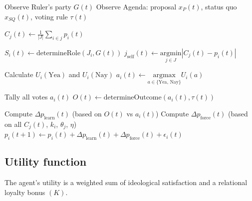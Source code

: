 \documentclass{article}
\begin{document}
	\begin{algorithm}[H]
		\caption{Policy drift game loop}
		\label{alg:game_loop}
		\begin{algorithmic}[1]
			
			\STATE {}
			\STATE Observe Ruler's party $G(t)$
			\STATE Observe Agenda: proposal $x_P(t)$, status quo $x_{SQ}(t)$, voting rule $\tau(t)$ 
			
			\STATE {}
			\STATE $C_j(t) \gets \frac{1}{|J|} \sum_{i \in j} p_i(t)$ 
			\ENDFOR
			
			\STATE $S_i(t) \gets \text{determineRole}(J_i, G(t))$ 
			\STATE $j_{\text{self}}(t) \gets \underset{j \in J}{\text{argmin}} |C_j(t) - p_i(t)|$ 
			\ENDFOR
			
			\STATE {}
			\STATE Calculate $U_i(\text{Yea})$ and $U_i(\text{Nay})$ 
			\STATE $a_i(t) \gets \underset{a \in \{\text{Yea, Nay}\}}{\text{argmax}} U_i(a)$ 
			\ENDFOR
			
			\STATE {}
			\STATE Tally all votes $a_i(t)$
			\STATE $O(t) \gets \text{determineOutcome}(a_i(t), \tau(t))$ 
			
			\STATE {}
			\STATE Compute $\Delta p_{\text{learn}}(t)$ (based on $O(t)$ vs $a_i(t)$)
			\STATE Compute $\Delta p_{\text{force}}(t)$ (based on all $C_j(t)$, $k_i$, $\theta_j$, $\eta$)
			\STATE $p_i(t+1) \gets p_i(t) + \Delta p_{\text{learn}}(t) + \Delta p_{\text{force}}(t) + \epsilon_{i}(t)$ 
			\ENDFOR
			\ENDFOR
			
		\end{algorithmic}
	\end{algorithm}
	
	\subsection{Utility function}
	
	The agent's utility is a weighted sum of ideological satisfaction and a relational loyalty bonus $(K)$.
	
\end{document}
